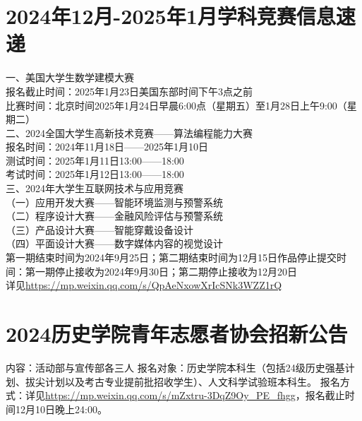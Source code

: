 \documentclass[letterpaper, 12pt]{article}
\begin{document}
\begin{multicols}{2}
\section{2024年12月-2025年1月学科竞赛信息速递}
一、美国大学生数学建模大赛\\
报名截止时间：2025年1月23日美国东部时间下午3点之前\\
比赛时间：北京时间2025年1月24日早晨6:00点（星期五）至1月28日上午9:00（星期二）\\
二、2024全国大学生高新技术竞赛——算法编程能力大赛\\
报名时间：2024年11月18日——2025年1月10日\\
测试时间：2025年1月11日13:00——18:00\\
考试时间：2025年1月12日13:00——18:00\\
三、2024年大学生互联网技术与应用竞赛\\
（一）应用开发大赛——智能环境监测与预警系统\\
（二）程序设计大赛——金融风险评估与预警系统\\
（三）产品设计大赛——智能穿戴设备设计\\
（四）平面设计大赛——数字媒体内容的视觉设计\\
第一期结束时间为2024年9月25日；第二期结束时间为12月15日作品停止提交时间：第一期停止接收为2024年9月30日；第二期停止接收为12月20日\\
详见\url{https://mp.weixin.qq.com/s/QpAeNxowXrIcSNk3WZZ1rQ}

\section{2024历史学院青年志愿者协会招新公告}
内容：活动部与宣传部各三人
报名对象：历史学院本科生（包括24级历史强基计划、拔尖计划以及考古专业提前批招收学生）、人文科学试验班本科生。
报名方式：详见\url{https://mp.weixin.qq.com/s/mZxtru-3DqZ9Oy_PE_fhgg}，报名截止时间12月10日晚上24:00。
\end{multicols} 
\end{document}
